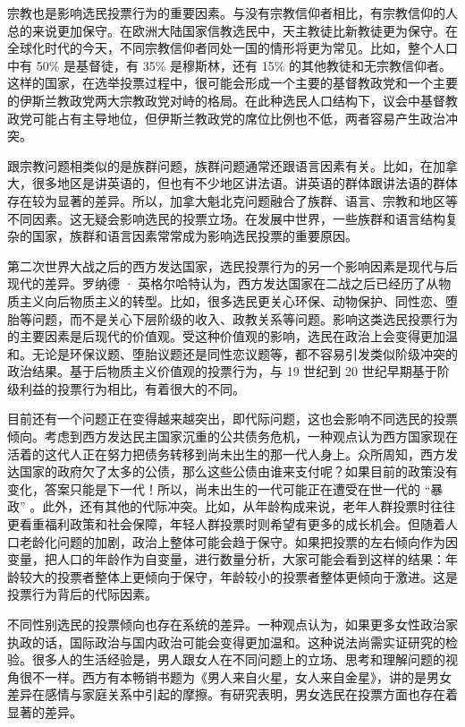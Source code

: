宗教也是影响选民投票行为的重要因素。与没有宗教信仰者相比，有宗教信仰的人总的来说更加保守。在欧洲大陆国家信教选民中，天主教徒比新教徒更为保守。在全球化时代的今天，不同宗教信仰者同处一国的情形将更为常见。比如，整个人口中有 50\% 是基督徒，有 35\% 是穆斯林，还有 15\% 的其他教徒和无宗教信仰者。这样的国家，在选举投票过程中，很可能会形成一个主要的基督教政党和一个主要的伊斯兰教政党两大宗教政党对峙的格局。在此种选民人口结构下，议会中基督教政党可能占有主导地位，但伊斯兰教政党的席位比例也不低，两者容易产生政治冲突。

跟宗教问题相类似的是族群问题，族群问题通常还跟语言因素有关。比如，在加拿大，很多地区是讲英语的，但也有不少地区讲法语。讲英语的群体跟讲法语的群体存在较为显著的差异。所以，加拿大魁北克问题融合了族群、语言、宗教和地区等不同因素。这无疑会影响选民的投票立场。在发展中世界，一些族群和语言结构复杂的国家，族群和语言因素常常成为影响选民投票的重要原因。

第二次世界大战之后的西方发达国家，选民投票行为的另一个影响因素是现代与后现代的差异。罗纳德 · 英格尔哈特认为，西方发达国家在二战之后已经历了从物质主义向后物质主义的转型。比如，很多选民更关心环保、动物保护、同性恋、堕胎等问题，而不是关心下层阶级的收入、政教关系等问题。影响这类选民投票行为的主要因素是后现代的价值观。受这种价值观的影响，选民在政治上会变得更加温和。无论是环保议题、堕胎议题还是同性恋议题等，都不容易引发类似阶级冲突的政治结果。基于后物质主义价值观的投票行为，与 19 世纪到 20 世纪早期基于阶级利益的投票行为相比，有着很大的不同。

目前还有一个问题正在变得越来越突出，即代际问题，这也会影响不同选民的投票倾向。考虑到西方发达民主国家沉重的公共债务危机，一种观点认为西方国家现在活着的这代人正在努力把债务转移到尚未出生的那一代人身上。众所周知，西方发达国家的政府欠了太多的公债，那么这些公债由谁来支付呢？如果目前的政策没有变化，答案只能是下一代！所以，尚未出生的一代可能正在遭受在世一代的 “暴政” 。此外，还有其他的代际冲突。比如，从年龄构成来说，老年人群投票时往往更看重福利政策和社会保障，年轻人群投票时则希望有更多的成长机会。但随着人口老龄化问题的加剧，政治上整体可能会趋于保守。如果把投票的左右倾向作为因变量，把人口的年龄作为自变量，进行数量分析，大家可能会看到这样的结果：年龄较大的投票者整体上更倾向于保守，年龄较小的投票者整体更倾向于激进。这是投票行为背后的代际因素。

不同性别选民的投票倾向也存在系统的差异。一种观点认为，如果更多女性政治家执政的话，国际政治与国内政治可能会变得更加温和。这种说法尚需实证研究的检验。很多人的生活经验是，男人跟女人在不同问题上的立场、思考和理解问题的视角很不一样。西方有本畅销书题为《男人来自火星，女人来自金星》，讲的是男女差异在感情与家庭关系中引起的摩擦。有研究表明，男女选民在投票方面也存在着显著的差异。


